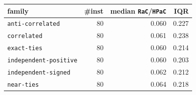 \begin{tabular}{@{}lrrr@{}}
\toprule
family & \#inst & median \texttt{RaC}/\texttt{HPaC} & IQR \\
\midrule
\texttt{anti-correlated} & 80 & 0.060 & 0.227 \\
\texttt{correlated} & 80 & 0.061 & 0.238 \\
\texttt{exact-ties} & 80 & 0.060 & 0.214 \\
\texttt{independent-positive} & 80 & 0.060 & 0.203 \\
\texttt{independent-signed} & 80 & 0.062 & 0.212 \\
\texttt{near-ties} & 80 & 0.064 & 0.218 \\
\bottomrule
\end{tabular}
